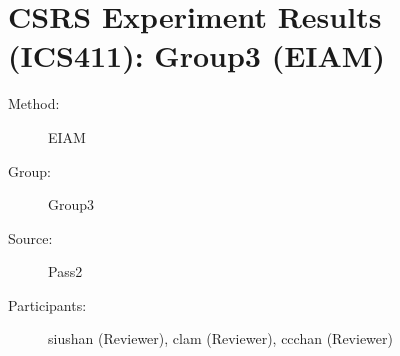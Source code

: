 \chapter {CSRS Experiment Results (ICS411): Group3 (EIAM)}
\small
	  

\begin{description}
\item [Method:] EIAM
\item [Group:] Group3
\item [Source:] Pass2
\item [Participants:] siushan (Reviewer), clam (Reviewer), ccchan (Reviewer)
\end{description}
